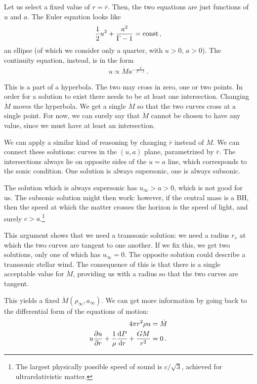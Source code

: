 \documentclass[main.tex]{subfiles}
\begin{document}
Let us select a fixed value of \(r = \overline{r}\). Then, the two equations are just functions of \(u\) and \(a\). The Euler equation looks like 
%
\begin{align}
\frac{1}{2} u^2 + \frac{a^2}{\Gamma -1} = \text{const}
\,,
\end{align}
%
an ellipse (of which we consider only a quarter, with \(u>0\), \(a>0\)). 
The continuity equation, instead, is in the form 
%
\begin{align}
u \propto  \dot{M} a^{- \frac{2}{\Gamma -1}}
\,.
\end{align}

This is a part of a hyperbola. The two may cross in zero, one or two points. In order for a solution to exist there needs to be at least one intersection. 
Changing \(\dot{M}\) moves the hyperbola. We get a single \(\dot{M}\) so that the two curves cross at a single point.
For now, we can surely say that \(\dot{M}\) cannot be chosen to have any value, since we must have at least an intersection. 

We can apply a similar kind of reasoning by changing \(\overline{r}\) instead of \(\dot{M}\). 
We can connect these solutions: curves in the \((u, a)\) plane, parametrized by \(\overline{r}\). 
The intersections always lie on opposite sides of the \(u = a\) line, which corresponds to the sonic condition. 
One solution is always supersonic, one is always subsonic. 

The solution which is always supersonic has \(u_\infty > a > 0\), which is not good for us. 
The subsonic solution might then work: however, if the central mass is a BH, then the speed at which the matter crosses the horizon is the speed of light, and surely \(c > a\).\footnote{The largest physically possible speed of sound is \(c / \sqrt{3}\), achieved for ultrarelativistic matter.}

This argument shows that we need a transsonic solution: we need a radius \(r_s\) at which the two curves are tangent to one another. 
If we fix this, we get two solutions, only one of which has \(u_\infty = 0\). 
The opposite solution could describe a transsonic stellar wind. 
The consequence of this is that there is a single acceptable value for \(\dot{M}\), providing us with a radius so that the two curves are tangent. 

This yields a fixed \(\dot{M} (\rho _\infty , a_\infty )\). 
We can get more information by going back to the differential form of the equations of motion: 
%
\begin{align}
4 \pi r^2 \rho u &= \dot{M}  \\
u \pdv{u}{r} + \frac{1}{\rho } \dv{P}{r} + \frac{GM}{r^2} &= 0
\,.
\end{align}
\end{document}
